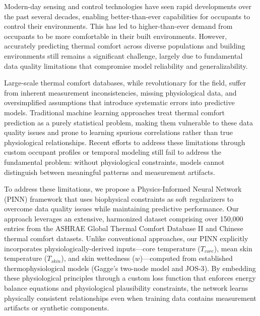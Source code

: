 Modern-day sensing and control technologies have seen rapid developments over the past several decades, enabling better-than-ever capabilities for occupants to control their environments\cite{tartariniPythermalcomfortPythonPackage2020}. This has led to higher-than-ever demand from occupants to be more comfortable in their built environments. However, accurately predicting thermal comfort across diverse populations and building environments still remains a significant challenge\cite{liModifiedPredictedMean2025,wangRevisitingIndividualGroup2020c}, largely due to fundamental data quality limitations that compromise model reliability and generalizability.

Large-scale thermal comfort databases, while revolutionary for the field, suffer from inherent measurement inconsistencies, missing physiological data, and oversimplified assumptions that introduce systematic errors into predictive models. Traditional machine learning approaches\cite{luo_comparing_2020,al-sharifPredictingThermalPreferences2024,wangDimensionAnalysisSubjective2020b} treat thermal comfort prediction as a purely statistical problem, making them vulnerable to these data quality issues and prone to learning spurious correlations rather than true physiological relationships. Recent efforts to address these limitations through custom occupant profiles\cite{haghiradAdvancingPersonalThermal2024} or temporal modeling still fail to address the fundamental problem: without physiological constraints, models cannot distinguish between meaningful patterns and measurement artifacts.

To address these limitations, we propose a Physics-Informed Neural Network (PINN) framework that uses biophysical constraints as soft regularizers to overcome data quality issues while maintaining predictive performance. Our approach leverages an extensive, harmonized dataset comprising over 150,000 entries from the ASHRAE Global Thermal Comfort Database II\cite{foldvary_licina_development_2018} and Chinese thermal comfort datasets\cite{yang2023comparative}. Unlike conventional approaches, our PINN explicitly incorporates physiologically-derived inputs—core temperature ($T_{core}$), mean skin temperature ($T_{skin}$), and skin wettedness ($w$)—computed from established thermophysiological models (Gagge's two-node model\cite{gagge1971effective} and JOS-3\cite{takahashi2021thermoregulation}). By embedding these physiological principles through a custom loss function that enforces energy balance equations and physiological plausibility constraints, the network learns physically consistent relationships even when training data contains measurement artifacts or synthetic components.


